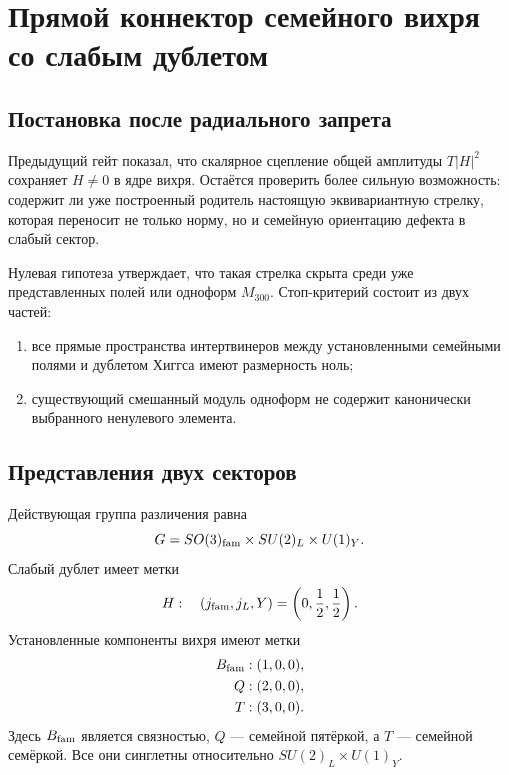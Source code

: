 \chapter{Прямой коннектор семейного вихря со слабым дублетом}
\label{ch:v6-spectral-transition-radial-bridge-vortex-connector-gate}

\section{Постановка после радиального запрета}

Предыдущий гейт показал, что скалярное сцепление общей амплитуды
$T|H|^2$ сохраняет $H\neq0$ в ядре вихря. Остаётся проверить более
сильную возможность: содержит ли уже построенный родитель настоящую
эквивариантную стрелку, которая переносит не только норму, но и
семейную ориентацию дефекта в слабый сектор.

Нулевая гипотеза утверждает, что такая стрелка скрыта среди уже
представленных полей или одноформ $M_{300}$. Стоп-критерий состоит из
двух частей:
\begin{enumerate}
 \item все прямые пространства интертвинеров между установленными
 семейными полями и дублетом Хиггса имеют размерность ноль;
 \item существующий смешанный модуль одноформ не содержит канонически
 выбранного ненулевого элемента.
\end{enumerate}

\section{Представления двух секторов}

Действующая группа различения равна
\begin{equation}
 G=SO(3)_{\rm fam}\times SU(2)_L\times U(1)_Y.
\end{equation}
Слабый дублет имеет метки
\begin{equation}
 H:\quad (j_{\rm fam},j_L,Y)=\left(0,\frac12,\frac12\right).
\end{equation}
Установленные компоненты вихря имеют метки
\begin{align}
 B_{\rm fam}&:(1,0,0),\nonumber\\
 Q&:(2,0,0),\nonumber\\
 T&:(3,0,0).
 \label{eq:v6-direct-connector-representations}
\end{align}
Здесь $B_{\rm fam}$ является связностью, $Q$ --- семейной пятёркой, а
$T$ --- семейной семёркой. Все они синглетны относительно
$SU(2)_L\times U(1)_Y$.

